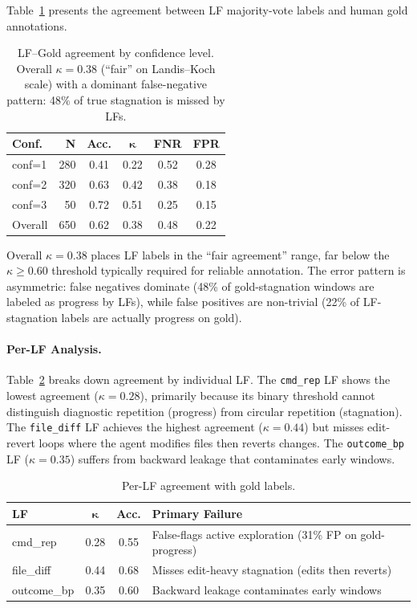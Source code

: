 \documentclass[11pt]{article}
\begin{document}
Table~\ref{tab:lf-gold} presents the agreement between LF majority-vote labels and human gold annotations.

\begin{table}[t]
\centering
\small
\begin{tabular}{lrcccc}
\toprule
\textbf{Conf.} & \textbf{N} & \textbf{Acc.} & $\boldsymbol{\kappa}$ & \textbf{FNR} & \textbf{FPR} \\
\midrule
conf=1 & 280 & 0.41 & 0.22 & 0.52 & 0.28 \\
conf=2 & 320 & 0.63 & 0.42 & 0.38 & 0.18 \\
conf=3 &  50 & 0.72 & 0.51 & 0.25 & 0.15 \\
\midrule
Overall & 650 & 0.62 & 0.38 & 0.48 & 0.22 \\
\bottomrule
\end{tabular}
\caption{LF--Gold agreement by confidence level. Overall $\kappa{=}0.38$ (``fair'' on Landis--Koch scale) with a dominant false-negative pattern: 48\% of true stagnation is missed by LFs.}
\label{tab:lf-gold}
\end{table}

Overall $\kappa{=}0.38$ places LF labels in the ``fair agreement'' range, far below the $\kappa{\geq}0.60$ threshold typically required for reliable annotation. The error pattern is asymmetric: false negatives dominate (48\% of gold-stagnation windows are labeled as progress by LFs), while false positives are non-trivial (22\% of LF-stagnation labels are actually progress on gold).

\paragraph{Per-LF Analysis.} Table~\ref{tab:per-lf} breaks down agreement by individual LF. The \texttt{cmd\_rep} LF shows the lowest agreement ($\kappa{=}0.28$), primarily because its binary threshold cannot distinguish diagnostic repetition (progress) from circular repetition (stagnation). The \texttt{file\_diff} LF achieves the highest agreement ($\kappa{=}0.44$) but misses edit-revert loops where the agent modifies files then reverts changes. The \texttt{outcome\_bp} LF ($\kappa{=}0.35$) suffers from backward leakage that contaminates early windows.

\begin{table}[t]
\centering
\small
\begin{tabular}{lccp{3.8cm}}
\toprule
\textbf{LF} & $\boldsymbol{\kappa}$ & \textbf{Acc.} & \textbf{Primary Failure} \\
\midrule
cmd\_rep & 0.28 & 0.55 & False-flags active exploration (31\% FP on gold-progress) \\
file\_diff & 0.44 & 0.68 & Misses edit-heavy stagnation (edits then reverts) \\
outcome\_bp & 0.35 & 0.60 & Backward leakage contaminates early windows \\
\bottomrule
\end{tabular}
\caption{Per-LF agreement with gold labels.}
\label{tab:per-lf}
\end{table}
\end{document}
